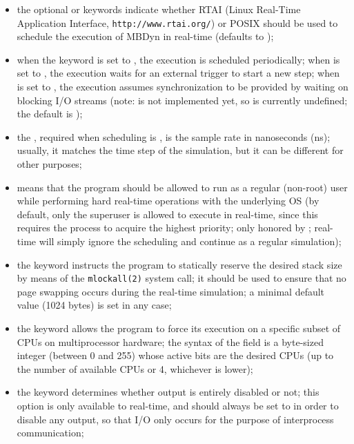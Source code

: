 \begin{itemize}
\item the optional  or  keywords indicate whether
RTAI (Linux Real-Time Application Interface, \texttt{http://www.rtai.org/})
or POSIX should be used to schedule the execution of MBDyn in real-time
(defaults to );

\item when the keyword  is set to , the execution
is scheduled periodically; when  is set to ,
the execution waits for an external trigger to start a new step;
when  is set to , the execution assumes synchronization
to be provided by waiting on blocking I/O streams
(note:  is not implemented yet,
so  is currently undefined;
the default  is );

\item the , required when scheduling is ,
is the sample rate in nanoseconds (ns); 
usually, it matches the time step of the simulation,
but it can be different for other purposes;

\item {} means that the program should be allowed to run
as a regular (non-root) user while performing hard real-time operations
with the underlying OS (by default, only the superuser is allowed
to execute in real-time, since this requires the process to acquire
the highest priority; only honored by ;
 real-time will simply ignore the scheduling and continue
as a regular simulation);

\item the keyword  instructs the program 
to statically reserve the desired stack size by means 
of the \texttt{mlockall(2)} system call; it should be used to ensure 
that no page swapping occurs during the real-time simulation;
a minimal default value (1024 bytes) is set in any case;

\item the keyword  allows the program to force its
execution on a specific subset of CPUs on multiprocessor hardware;
the syntax of the  field is a byte-sized integer 
(between 0 and 255) whose active bits are the desired CPUs
(up to the number of available CPUs or 4, whichever is lower);

\item the keyword  determines whether output is entirely disabled
or not; this option is only available to  real-time,
and should always be set to  in order to disable any output,
so that I/O only occurs for the purpose of interprocess communication;


\end{itemize}
